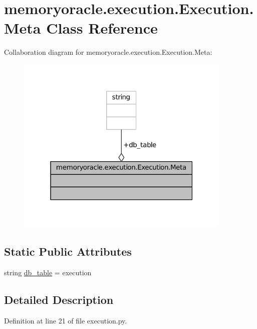 \hypertarget{classmemoryoracle_1_1execution_1_1Execution_1_1Meta}{}\section{memoryoracle.\+execution.\+Execution.\+Meta Class Reference}
\label{classmemoryoracle_1_1execution_1_1Execution_1_1Meta}


Collaboration diagram for memoryoracle.\+execution.\+Execution.\+Meta\+:
\nopagebreak
\begin{figure}[H]
\begin{center}
\leavevmode
\includegraphics[width=292pt]{classmemoryoracle_1_1execution_1_1Execution_1_1Meta__coll__graph}
\end{center}
\end{figure}
\subsection*{Static Public Attributes}
\begin{DoxyCompactItemize}
\item 
string \hyperlink{classmemoryoracle_1_1execution_1_1Execution_1_1Meta_ad4c8c998a7210fb5f3fd75bdaadeb5bc}{db\+\_\+table} = \textquotesingle{}execution\textquotesingle{}
\end{DoxyCompactItemize}


\subsection{Detailed Description}


Definition at line 21 of file execution.\+py.



